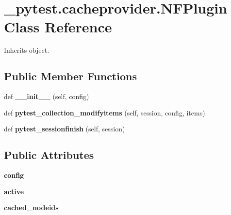\hypertarget{class__pytest_1_1cacheprovider_1_1_n_f_plugin}{}\section{\+\_\+pytest.\+cacheprovider.\+N\+F\+Plugin Class Reference}
\label{class__pytest_1_1cacheprovider_1_1_n_f_plugin}


Inherits object.

\subsection*{Public Member Functions}
\begin{DoxyCompactItemize}
\item 
\mbox{\label{class__pytest_1_1cacheprovider_1_1_n_f_plugin_a36378e888891f352704ad5d25a8f704f}} 
def {\bfseries \+\_\+\+\_\+init\+\_\+\+\_\+} (self, config)
\item 
\mbox{\label{class__pytest_1_1cacheprovider_1_1_n_f_plugin_a36d31994a9631cc385e7928441099da9}} 
def {\bfseries pytest\+\_\+collection\+\_\+modifyitems} (self, session, config, items)
\item 
\mbox{\label{class__pytest_1_1cacheprovider_1_1_n_f_plugin_a9ba3b62e6dbc2721c1c10cb400a1e677}} 
def {\bfseries pytest\+\_\+sessionfinish} (self, session)
\end{DoxyCompactItemize}
\subsection*{Public Attributes}
\begin{DoxyCompactItemize}
\item 
\mbox{\label{class__pytest_1_1cacheprovider_1_1_n_f_plugin_a5d1e08d407163c628d672048a6cdd64c}} 
{\bfseries config}
\item 
\mbox{\label{class__pytest_1_1cacheprovider_1_1_n_f_plugin_af3891b595439f0f5342a124c7318051b}} 
{\bfseries active}
\item 
\mbox{\label{class__pytest_1_1cacheprovider_1_1_n_f_plugin_a47ef5d5fff47642cb38172d35fc9d189}} 
{\bfseries cached\+\_\+nodeids}
\end{DoxyCompactItemize}


